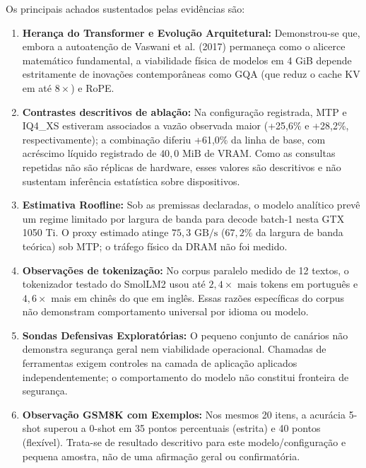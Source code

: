 \documentclass[10pt,a4paper,twocolumn]{article}
\begin{document}
Os principais achados sustentados pelas evid\^encias s\~ao:
\begin{enumerate}[leftmargin=1.5em,itemsep=0.2em]
    \item \textbf{Heran\c{c}a do Transformer e Evolu\c{c}\~ao Arquitetural:} Demonstrou-se que, embora a autoaten\c{c}\~ao de Vaswani et al. (2017) permane\c{c}a como o alicerce matem\'atico fundamental, a viabilidade f\'isica de modelos em 4 GiB depende estritamente de inova\c{c}\~oes contempor\^aneas como GQA (que reduz o cache KV em at\'e $8\times$) e RoPE.
    \item \textbf{Contrastes descritivos de abla\c{c}\~ao:} Na configura\c{c}\~ao registrada, MTP e IQ4\_XS estiveram associados a vaz\~ao observada maior (+25,6\% e +28,2\%, respectivamente); a combina\c{c}\~ao diferiu +61,0\% da linha de base, com acr\'escimo l\'iquido registrado de $40,0\text{ MiB}$ de VRAM. Como as consultas repetidas n\~ao s\~ao r\'eplicas de hardware, esses valores s\~ao descritivos e n\~ao sustentam infer\^encia estat\'istica sobre dispositivos.
    \item \textbf{Estimativa Roofline:} Sob as premissas declaradas, o modelo anal\'itico prev\^e um regime limitado por largura de banda para decode batch-1 nesta GTX 1050 Ti. O proxy estimado atinge $75,3\text{ GB/s}$ ($67,2\%$ da largura de banda te\'orica) sob MTP; o tr\'afego f\'isico da DRAM n\~ao foi medido.
    \item \textbf{Observa\c{c}\~oes de tokeniza\c{c}\~ao:} No corpus paralelo medido de 12 textos, o tokenizador testado do SmolLM2 usou at\'e $2,4\times$ mais tokens em portugu\^es e $4,6\times$ mais em chin\^es do que em ingl\^es. Essas raz\~oes espec\'ificas do corpus n\~ao demonstram comportamento universal por idioma ou modelo.
    \item \textbf{Sondas Defensivas Explorat\'orias:} O pequeno conjunto de can\'arios n\~ao demonstra seguran\c{c}a geral nem viabilidade operacional. Chamadas de ferramentas exigem controles na camada de aplica\c{c}\~ao aplicados independentemente; o comportamento do modelo n\~ao constitui fronteira de seguran\c{c}a.
    \item \textbf{Observa\c{c}\~ao GSM8K com Exemplos:} Nos mesmos 20 itens, a acur\'acia 5-shot superou a 0-shot em 35 pontos percentuais (estrita) e 40 pontos (flex\'ivel). Trata-se de resultado descritivo para este modelo/configura\c{c}\~ao e pequena amostra, n\~ao de uma afirma\c{c}\~ao geral ou confirmat\'oria.
\end{enumerate}
\end{document}
